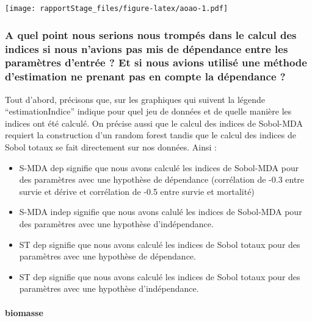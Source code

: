\documentclass[
]{article}
\begin{document}
\texttt{[image: rapportStage\_files/figure-latex/aoao-1.pdf]}

\hypertarget{a-quel-point-nous-serions-nous-trompuxe9s-dans-le-calcul-des-indices-si-nous-navions-pas-mis-de-duxe9pendance-entre-les-paramuxe8tres-dentruxe9e-et-si-nous-avions-utilisuxe9-une-muxe9thode-destimation-ne-prenant-pas-en-compte-la-duxe9pendance}{%
\subsubsection{A quel point nous serions nous trompés dans le calcul des
indices si nous n'avions pas mis de dépendance entre les paramètres
d'entrée ? Et si nous avions utilisé une méthode d'estimation ne prenant
pas en compte la dépendance
?}\label{a-quel-point-nous-serions-nous-trompuxe9s-dans-le-calcul-des-indices-si-nous-navions-pas-mis-de-duxe9pendance-entre-les-paramuxe8tres-dentruxe9e-et-si-nous-avions-utilisuxe9-une-muxe9thode-destimation-ne-prenant-pas-en-compte-la-duxe9pendance}}

Tout d'abord, précisons que, sur les graphiques qui suivent la légende
``estimationIndice'' indique pour quel jeu de données et de quelle
manière les indices ont été calculé. On précise aussi que le calcul des
indices de Sobol-MDA requiert la construction d'un random forest tandis
que le calcul des indices de Sobol totaux se fait directement sur nos
données. Ainsi :

\begin{itemize}
\item
  S-MDA dep signifie que nous avons calculé les indices de Sobol-MDA
  pour des paramètres avec une hypothèse de dépendance (corrélation de
  -0.3 entre survie et dérive et corrélation de -0.5 entre survie et
  mortalité)
\item
  S-MDA indep signifie que nous avons calulé les indices de Sobol-MDA
  pour des paramètres avec une hypothèse d'indépendance.
\item
  ST dep signifie que nous avons calculé les indices de Sobol totaux
  pour des paramètres avec une hypothèse de dépendance.
\item
  ST dep signifie que nous avons calculé les indices de Sobol totaux
  pour des paramètres avec une hypothèse d'indépendance.
\end{itemize}

\hypertarget{biomasse-8}{%
\paragraph{biomasse}\label{biomasse-8}}
\end{document}
